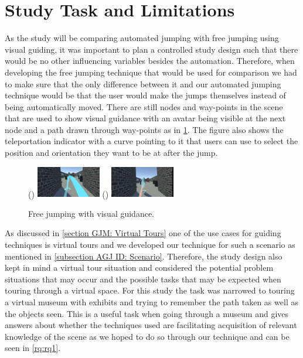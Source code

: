 \section{Study Task and Limitations}
\label{section DPUS: Study Task and Limitations}
As the study will be comparing automated jumping with free jumping using visual guiding, it was important to plan a controlled study design such that there would be no other influencing variables besides the automation. Therefore, when developing the free jumping technique that would be used for comparison we had to make sure that the only difference between it and our automated jumping technique would be that the user would make the jumps themselves instead of being automatically moved. There are still nodes and way-points in the scene that are used to show visual guidance with an avatar being visible at the next node and a path drawn through way-points as in \cref{fig:study-free-jumping}. The figure also shows the teleportation indicator with a curve pointing to it that users can use to select the position and orientation they want to be at after the jump.

\begin{figure}[]
	()
	\includegraphics[width=0.25\textwidth]{images/free-jumping.pdf}
	()
	\includegraphics[width=0.25\textwidth]{images/automated-jumping.pdf}
	\caption{Free jumping with visual guidance.}
	\label{fig:study-free-jumping}
\end{figure}

As discussed in \cref{section GJM: Virtual Tours} one of the use cases for guiding techniques is virtual tours and we developed our technique for such a scenario as mentioned in \cref{subsection AGJ ID: Scenario}. Therefore, the study design also kept in mind a virtual tour situation and considered the potential problem situations that may occur and the possible tasks that may be expected when touring through a virtual space. For this study the task was narrowed to touring a virtual museum with exhibits and trying to remember the path taken as well as the objects seen. This is a useful task when going through a museum and gives answers about whether the techniques used are facilitating acquisition of relevant knowledge of the scene as we hoped to do so through our technique and can be seen in \cref{rq:rq1}.

